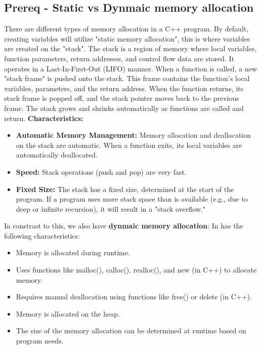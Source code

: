 \documentclass{report}
\begin{document}
    \bigbreak \noindent 
    \subsection{Prereq - Static vs Dynmaic memory allocation}
    \bigbreak \noindent 
    There are different types of memory allocation in a C++ program. By default, creating variables will utilize "static memory allocation", this is where variables are created on the "stack". The stack is a region of memory where local variables, function parameters, return addresses, and control flow data are stored. It operates in a Last-In-First-Out (LIFO) manner.
    \bigbreak \noindent 
    When a function is called, a new "stack frame" is pushed onto the stack. This frame contains the function's local variables, parameters, and the return address.
    When the function returns, its stack frame is popped off, and the stack pointer moves back to the previous frame.
    The stack grows and shrinks automatically as functions are called and return.
    \bigbreak \noindent 
    \textbf{Characteristics:}
    \begin{itemize}
        \item \textbf{Automatic Memory Management:} Memory allocation and deallocation on the stack are automatic. When a function exits, its local variables are automatically deallocated.
        \item \textbf{Speed:} Stack operations (push and pop) are very fast.
        \item \textbf{Fixed Size:} The stack has a fixed size, determined at the start of the program. If a program uses more stack space than is available (e.g., due to deep or infinite recursion), it will result in a "stack overflow."
    \end{itemize}
    \bigbreak \noindent 
    In constrast to this, we also have \textbf{dynmaic memory allocation}: In has the following characteristics:
    \begin{itemize}
        \item Memory is allocated during runtime.
        \item Uses functions like malloc(), calloc(), realloc(), and new (in C++) to allocate memory.
        \item Requires manual deallocation using functions like free() or delete (in C++).
        \item Memory is allocated on the heap.
        \item The size of the memory allocation can be determined at runtime based on program needs.
    \end{itemize}
\end{document}
